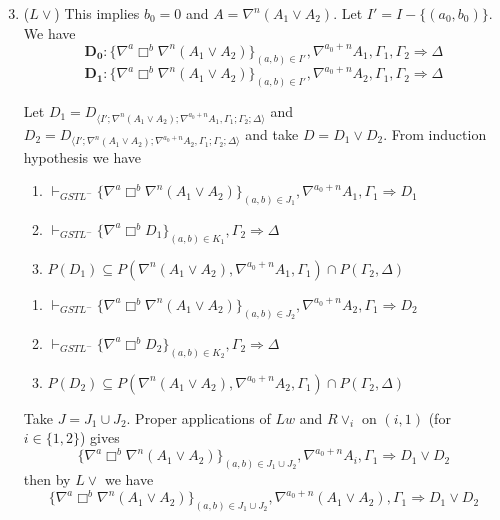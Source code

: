 \begin{enumerate}
	\setcounter{enumi}{2}
	\item ($L\lor$) This implies $b_0 = 0$ and $A = \nabla^n(A_1 \lor A_2)$. Let $I' = I - \{(a_0,b_0)\}$. We have
	\[ \mathbf{D_0} : \{ \nabla^a \Box^b \nabla^n (A_1 \lor A_2) \}_{(a,b) \in I'} , \nabla^{a_0 + n} A_1 , \Gamma_1 , \Gamma_2 \Rightarrow \Delta \]
	\[ \mathbf{D_1} : \{ \nabla^a \Box^b \nabla^n (A_1 \lor A_2) \}_{(a,b) \in I'} , \nabla^{a_0 + n} A_2 , \Gamma_1 , \Gamma_2 \Rightarrow \Delta\]
	\begin{prooftree}
	\end{prooftree}
	Let $D_1 = D_{\langle I';\nabla^n(A_1 \lor A_2);\nabla^{a_0+n}A_1,\Gamma_1;\Gamma_2;\Delta \rangle}$ and $D_2 = D_{\langle I';\nabla^n(A_1 \lor A_2);\nabla^{a_0+n}A_2,\Gamma_1;\Gamma_2;\Delta \rangle}$ and take $D = D_1 \lor D_2$. From induction hypothesis we have
	\begin{enumerate}[label=(1.\arabic*)]
		\item $\vdash_{GSTL^-} \{\nabla^a \Box^b \nabla^n (A_1 \lor A_2) \}_{(a,b) \in J_1} , \nabla^{a_0+n} A_1 , \Gamma_1 \Rightarrow D_1$
		\item $\vdash_{GSTL^-} \{\nabla^a \Box^b D_1\}_{(a,b) \in K_1}, \Gamma_2 \Rightarrow \Delta$
		\item $P(D_1) \subseteq P(\nabla^n(A_1 \lor A_2),\nabla^{a_0+n}A_1,\Gamma_1) \cap P(\Gamma_2,\Delta)$
	\end{enumerate}
	\begin{enumerate}[label=(2.\arabic*)]
		\item $\vdash_{GSTL^-} \{\nabla^a \Box^b \nabla^n (A_1 \lor A_2) \}_{(a,b) \in J_2} , \nabla^{a_0+n} A_2 , \Gamma_1 \Rightarrow D_2$
		\item $\vdash_{GSTL^-} \{\nabla^a \Box^b D_2\}_{(a,b) \in K_2}, \Gamma_2 \Rightarrow \Delta$
		\item $P(D_2) \subseteq P(\nabla^n(A_1 \lor A_2),\nabla^{a_0+n}A_2,\Gamma_1) \cap P(\Gamma_2,\Delta)$
	\end{enumerate}
	Take $J = J_1 \cup J_2$. Proper applications of $Lw$ and $R\lor_i$ on $(i,1)$ (for $i \in \{1,2\}$) gives
	\[\{\nabla^a \Box^b \nabla^n (A_1 \lor A_2) \}_{(a,b) \in J_1 \cup J_2} , \nabla^{a_0+n} A_i , \Gamma_1 \Rightarrow D_1 \lor D_2\]
	then by $L\lor$ we have
	\[\{\nabla^a \Box^b \nabla^n (A_1 \lor A_2) \}_{(a,b) \in J_1 \cup J_2} , \nabla^{a_0+n} (A_1 \lor A_2) , \Gamma_1 \Rightarrow D_1 \lor D_2\]
\end{enumerate}

